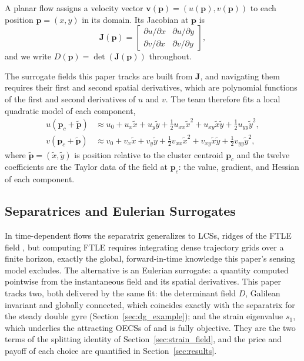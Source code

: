 \documentclass[lettersize,journal]{IEEEtran}
\begin{document}
A planar flow assigns a velocity vector $\mathbf{v}(\mathbf{p}) =
(u(\mathbf{p}), v(\mathbf{p}))$ to each position $\mathbf{p} = (x, y)$ in its
domain. Its Jacobian at $\mathbf{p}$ is
\begin{equation}
    \mathbf{J}(\mathbf{p}) =
    \begin{bmatrix}
        \partial u / \partial x & \partial u / \partial y \\
        \partial v / \partial x & \partial v / \partial y
    \end{bmatrix},
    \label{eq:jacobian}
\end{equation}
and we write $D(\mathbf{p}) = \det(\mathbf{J}(\mathbf{p}))$ throughout.

The surrogate fields this paper tracks are built from $\mathbf{J}$, and
navigating them requires their first and second spatial derivatives,
which are polynomial functions of the first and second derivatives of
$u$ and $v$. The team therefore fits a local quadratic model of each
component,
\begin{align}
    u(\mathbf{p}_c + \tilde{\mathbf{p}}) &\approx u_0 + u_x \tilde{x}
        + u_y \tilde{y} + \tfrac{1}{2} u_{xx} \tilde{x}^2
        + u_{xy} \tilde{x}\tilde{y} + \tfrac{1}{2} u_{yy} \tilde{y}^2,
        \label{eq:quad_model_u} \\
    v(\mathbf{p}_c + \tilde{\mathbf{p}}) &\approx v_0 + v_x \tilde{x}
        + v_y \tilde{y} + \tfrac{1}{2} v_{xx} \tilde{x}^2
        + v_{xy} \tilde{x}\tilde{y} + \tfrac{1}{2} v_{yy} \tilde{y}^2,
        \label{eq:quad_model_v}
\end{align}
where $\tilde{\mathbf{p}} = (\tilde{x}, \tilde{y})$ is position relative to
the cluster centroid $\mathbf{p}_c$ and the twelve coefficients are the
Taylor data of the field at $\mathbf{p}_c$: the value, gradient, and
Hessian of each component. 

\subsection{Separatrices and Eulerian Surrogates}
\label{sec:separatrix}

In time-dependent flows the separatrix generalizes to LCSs, ridges of
the FTLE field \cite{6,7,8}, but computing FTLE requires integrating
dense trajectory grids over a finite horizon, exactly the global,
forward-in-time knowledge this paper's sensing model excludes. The
alternative is an Eulerian surrogate: a quantity computed pointwise
from the instantaneous field and its spatial derivatives. This paper
tracks two, both delivered by the same fit: the determinant field $D$,
Galilean invariant and globally connected, which coincides exactly with
the separatrix for the steady double gyre
(Section~\ref{sec:dg_example}); and the strain eigenvalue $s_1$, which
underlies the attracting OECSs of \cite{17,18} and is fully objective.
They are the two terms of the splitting identity of
Section~\ref{sec:strain_field}, and the price and payoff of each choice
are quantified in Section~\ref{sec:results}.
\end{document}
